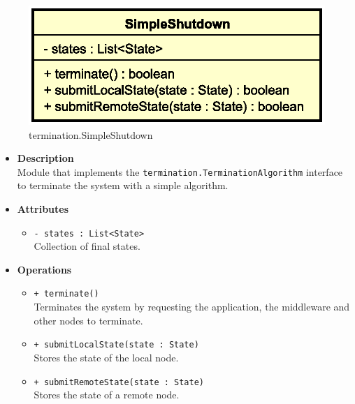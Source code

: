 
\begin{figure}[H]
  \centering
  \includegraphics[width=.5\columnwidth]{images/solution/mw/ter/sshut.eps}
  \caption{termination.SimpleShutdown}
  \label{fig:mw-termination-simple-shutdown}
\end{figure}

\FloatBarrier
\begin{itemize}
  \item \textbf{Description} \\
    Module that implements the \texttt{termination.TerminationAlgorithm}
    interface to terminate the system with a simple algorithm.
  \item \textbf{Attributes}
  \begin{itemize}
    \item \texttt{- states : List<State>} \\
    Collection of final states.
  \end{itemize}
  \item \textbf{Operations}
  \begin{itemize}
    \item \texttt{+ terminate()} \\
    Terminates the system by requesting the application, the middleware and
    other nodes to terminate.
    \item \texttt{+ submitLocalState(state : State)} \\
    Stores the state of the local node.
    \item \texttt{+ submitRemoteState(state : State)} \\
    Stores the state of a remote node.
  \end{itemize}
\end{itemize}
